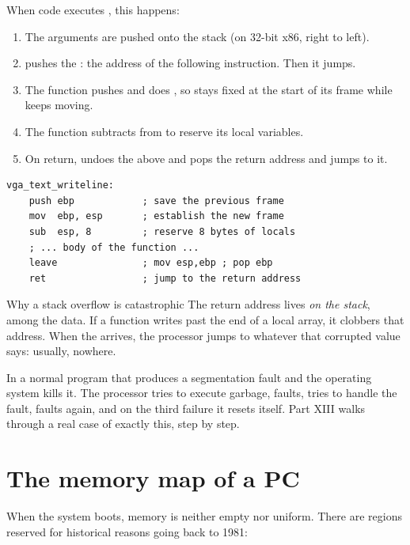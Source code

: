 When code executes , this happens:

\begin{enumerate}
  \item The arguments are pushed onto the stack (on 32-bit x86, right to left).
  \item {} pushes the : the address of the following instruction.
        Then it jumps.
  \item The function pushes  and does , so  stays fixed at the
        start of its frame while  keeps moving.
  \item The function subtracts from  to reserve its local variables.
  \item On return,  undoes the above and  pops the return address and jumps to
        it.
\end{enumerate}

\begin{lstlisting}[style=asm]
vga_text_writeline:
    push ebp            ; save the previous frame
    mov  ebp, esp       ; establish the new frame
    sub  esp, 8         ; reserve 8 bytes of locals
    ; ... body of the function ...
    leave               ; mov esp,ebp ; pop ebp
    ret                 ; jump to the return address
\end{lstlisting}

\begin{danger}{Why a stack overflow is catastrophic}
The return address lives \emph{on the stack}, among the data. If a function writes past the end of
a local array, it clobbers that address. When the  arrives, the processor jumps to
whatever that corrupted value says: usually, nowhere.

In a normal program that produces a segmentation fault and the operating system kills it.
 The processor tries to execute
garbage, faults, tries to handle the fault, faults again, and on the third failure it resets
itself. Part XIII walks through a real case of exactly this, step by step.
\end{danger}

\section{The memory map of a PC}

When the system boots, memory is neither empty nor uniform. There are regions reserved for
historical reasons going back to 1981:

